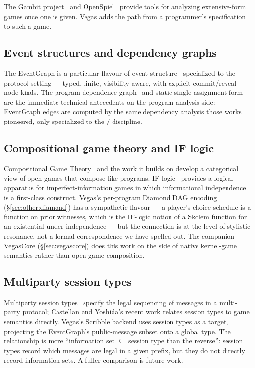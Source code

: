 The Gambit project~\citep{McKelveyMcLennanTurocy2006Gambit} and
OpenSpiel~\citep{LanctotEtAl2019OpenSpiel} provide tools for
analyzing extensive-form games once one is given.  Vegas adds
the path from a programmer's specification to such a game.

\subsection{Event structures and dependency graphs}

The EventGraph is a particular flavour of event
structure~\citep{NielsenPlotkinWinskel1981,Winskel1986EventStructures}
specialized to the protocol setting --- typed, finite,
visibility-aware, with explicit commit/reveal node kinds.  The
program-dependence graph~\citep{ferrante1987program} and
static-single-assignment form~\citep{cytron1991efficiently} are
the immediate technical antecedents on the program-analysis side:
EventGraph edges are computed by the same dependency analysis
those works pioneered, only specialized to the
/ discipline.

\subsection{Compositional game theory and IF logic}

Compositional Game Theory~\citep{GhaniHedgesWinschel2018CGT} and
the work it builds on develop a categorical view of open games
that compose like programs.  IF logic~\citep{HintikkaSandu1989,
MannSanduSevenster2011IFL} provides a logical apparatus for
imperfect-information games in which informational independence
is a first-class construct.  Vegas's per-program Diamond DAG
encoding (\S\ref{sec:other:diamond}) has a sympathetic flavour
--- a player's choice schedule is a function on prior witnesses,
which is the IF-logic notion of a Skolem function for an
existential under independence --- but the connection is at the
level of stylistic resonance, not a formal correspondence we
have spelled out.  The companion VegasCore
(\S\ref{sec:vegascore}) does this work on the side of native
kernel-game semantics rather than open-game composition.

\subsection{Multiparty session types}

Multiparty session types~\citep{HondaYoshidaCarbone2008MPST}
specify the legal sequencing of messages in a multi-party
protocol; Castellan and Yoshida's recent work
\citep{CastellanYoshidaSessionGame} relates session types to
game semantics directly.  Vegas's Scribble backend uses session
types as a target, projecting the EventGraph's public-message
subset onto a global type.  The relationship is more
``information set $\subseteq$ session type than the reverse'':
session types record which messages are legal in a given
prefix, but they do not directly record information sets.  A
fuller comparison is future work.

